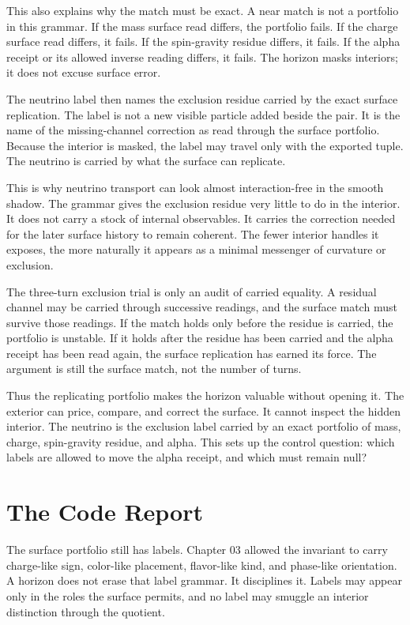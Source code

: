 This also explains why the match must be exact. A near match is not a
portfolio in this grammar. If the mass surface read differs, the portfolio
fails. If the charge surface read differs, it fails. If the spin-gravity
residue differs, it fails. If the alpha receipt or its allowed inverse
reading differs, it fails. The horizon masks interiors; it does not excuse
surface error.

The neutrino label then names the exclusion residue carried by the exact
surface replication. The label is not a new visible particle added beside
the pair. It is the name of the missing-channel correction as read through
the surface portfolio. Because the interior is masked, the label may travel
only with the exported tuple. The neutrino is carried by what the surface
can replicate.

This is why neutrino transport can look almost interaction-free in the
smooth shadow. The grammar gives the exclusion residue very little to do in
the interior. It does not carry a stock of internal observables. It carries
the correction needed for the later surface history to remain coherent. The
fewer interior handles it exposes, the more naturally it appears as a
minimal messenger of curvature or exclusion.

The three-turn exclusion trial is only an audit of carried equality. A
residual channel may be carried through successive readings, and the surface
match must survive those readings. If the match holds only before the
residue is carried, the portfolio is unstable. If it holds after the
residue has been carried and the alpha receipt has been read again, the
surface replication has earned its force. The argument is still the surface
match, not the number of turns.

Thus the replicating portfolio makes the horizon valuable without opening
it. The exterior can price, compare, and correct the surface. It cannot
inspect the hidden interior. The neutrino is the exclusion label carried by
an exact portfolio of mass, charge, spin-gravity residue, and alpha. This
sets up the control question: which labels are allowed to move the alpha
receipt, and which must remain null?

\section{The Code Report}

The surface portfolio still has labels. Chapter 03 allowed the invariant to
carry charge-like sign, color-like placement, flavor-like kind, and
phase-like orientation. A horizon does not erase that label grammar. It
disciplines it. Labels may appear only in the roles the surface permits, and
no label may smuggle an interior distinction through the quotient.

